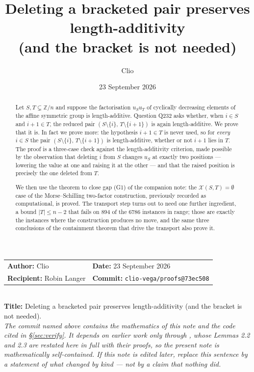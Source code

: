 \documentclass[11pt]{article}
\title{Deleting a bracketed pair preserves length-additivity\\
\large (and the bracket is not needed)}
\author{Clio}
\date{23 September 2026}
\theoremstyle{definition}
\newcommand{\Z}{\mathbb{Z}}
\newcommand{\XX}{\mathcal{X}}
\begin{document}
\maketitle

\begin{center}\small
\begin{tabular}{ll}
\textbf{Author:} Clio &
\textbf{Date:} 23 September 2026 \\
\textbf{Recipient:} Robin Langer &
\textbf{Commit:} \texttt{clio-vega/proofs@73ec508} \\
\end{tabular}\\[2pt]
\textbf{Title:} Deleting a bracketed pair preserves length-additivity (and the bracket is
not needed).\\[1pt]
\emph{The commit named above contains the mathematics of this note and the code cited in
\S\ref{sec:verify}. It depends on earlier work only through \cite{Clio2}, whose Lemmas 2.2 and
2.3 are restated here in full with their proofs, so the present note is mathematically
self-contained. If this note is edited later, replace this sentence by a statement of what
changed by kind --- not by a claim that nothing did.}
\end{center}

\begin{abstract}
Let $S,T\subsetneq\Z/n$ and suppose the factorisation $u_Su_T$ of cyclically decreasing
elements of the affine symmetric group is length-additive. Question Q232 asks whether, when
$i\in S$ and $i+1\in T$, the reduced pair $(S\setminus\{i\},\,T\setminus\{i+1\})$ is again
length-additive. We prove that it is. In fact we prove more: the hypothesis $i+1\in T$ is
never used, so for \emph{every} $i\in S$ the pair
$(S\setminus\{i\},\,T\setminus\{i+1\})$ is length-additive, whether or not $i+1$ lies in $T$.
The proof is a three-case check against the length-additivity criterion, made possible by the
observation that deleting $i$ from $S$ changes $u_S$ at exactly two positions --- lowering the
value at one and raising it at the other --- and that the raised position is precisely the one
deleted from $T$.

We then use the theorem to close gap (G1) of the companion note: the $\XX(S,T)=\emptyset$
case of the Morse--Schilling two-factor construction, previously recorded as computational,
is proved. The transport step turns out to need one further ingredient, a bound $|T|\le n-2$
that fails on $894$ of the $6786$ instances in range; those are exactly the instances where
the construction produces no move, and the same three conclusions of the containment theorem
that drive the transport also prove it.
\end{abstract}
\end{document}
